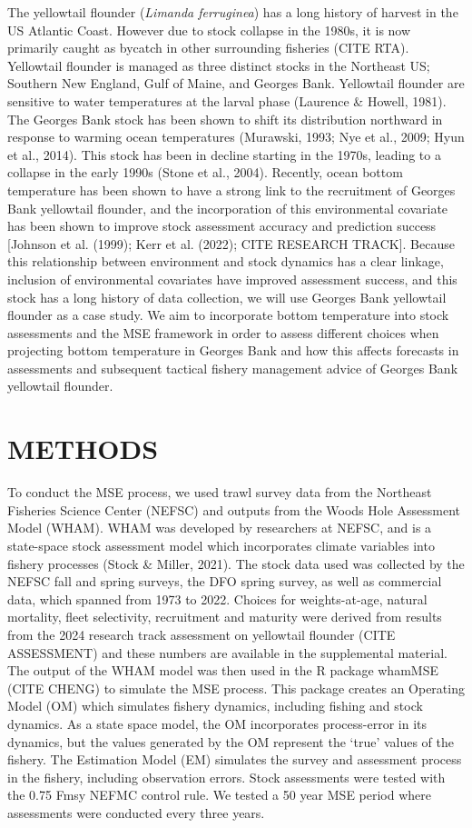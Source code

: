 \documentclass[
  12pt,
]{article}
\begin{document}
The yellowtail flounder (\emph{Limanda ferruginea}) has a long history of harvest in the US Atlantic Coast. However due to stock collapse in the 1980s, it is now primarily caught as bycatch in other surrounding fisheries (CITE RTA). Yellowtail flounder is managed as three distinct stocks in the Northeast US; Southern New England, Gulf of Maine, and Georges Bank. Yellowtail flounder are sensitive to water temperatures at the larval phase (Laurence \& Howell, 1981). The Georges Bank stock has been shown to shift its distribution northward in response to warming ocean temperatures (Murawski, 1993; Nye et al., 2009; Hyun et al., 2014). This stock has been in decline starting in the 1970s, leading to a collapse in the early 1990s (Stone et al., 2004). Recently, ocean bottom temperature has been shown to have a strong link to the recruitment of Georges Bank yellowtail flounder, and the incorporation of this environmental covariate has been shown to improve stock assessment accuracy and prediction success {[}Johnson et al. (1999); Kerr et al. (2022); CITE RESEARCH TRACK{]}. Because this relationship between environment and stock dynamics has a clear linkage, inclusion of environmental covariates have improved assessment success, and this stock has a long history of data collection, we will use Georges Bank yellowtail flounder as a case study. We aim to incorporate bottom temperature into stock assessments and the MSE framework in order to assess different choices when projecting bottom temperature in Georges Bank and how this affects forecasts in assessments and subsequent tactical fishery management advice of Georges Bank yellowtail flounder.

\section{METHODS}\label{methods}

To conduct the MSE process, we used trawl survey data from the Northeast Fisheries Science Center (NEFSC) and outputs from the Woods Hole Assessment Model (WHAM). WHAM was developed by researchers at NEFSC, and is a state-space stock assessment model which incorporates climate variables into fishery processes (Stock \& Miller, 2021). The stock data used was collected by the NEFSC fall and spring surveys, the DFO spring survey, as well as commercial data, which spanned from 1973 to 2022. Choices for weights-at-age, natural mortality, fleet selectivity, recruitment and maturity were derived from results from the 2024 research track assessment on yellowtail flounder (CITE ASSESSMENT) and these numbers are available in the supplemental material. The output of the WHAM model was then used in the R package whamMSE (CITE CHENG) to simulate the MSE process. This package creates an Operating Model (OM) which simulates fishery dynamics, including fishing and stock dynamics. As a state space model, the OM incorporates process-error in its dynamics, but the values generated by the OM represent the `true' values of the fishery. The Estimation Model (EM) simulates the survey and assessment process in the fishery, including observation errors. Stock assessments were tested with the 0.75 Fmsy NEFMC control rule. We tested a 50 year MSE period where assessments were conducted every three years.
\end{document}
